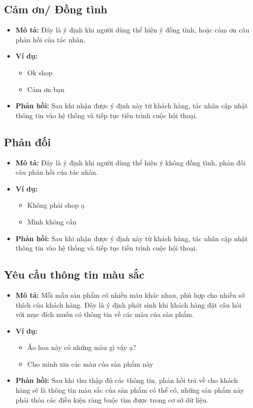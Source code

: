 \subsection{Cảm ơn/ Đồng tình}
\begin{itemize}
    \item \textbf{Mô tả:} Đây là ý định khi người dùng thể hiện ý đồng tình, hoặc cảm ơn câu phản hồi của tác nhân.
    \item \textbf{Ví dụ:}
    \begin{itemize}
        \item Ok shop
        \item Cảm ơn bạn
    \end{itemize}
    \item \textbf{Phản hồi:} Sau khi nhận được ý định này từ khách hàng, tác nhân cập nhật thông tin vào hệ thống và tiếp tục tiến trình cuộc hội thoại.
\end{itemize}

\subsection{Phản đối}
\begin{itemize}
    \item \textbf{Mô tả:} Đây là ý định khi người dùng thể hiện ý không đồng tình, phản đối câu phản hồi của tác nhân.
    \item \textbf{Ví dụ:}
    \begin{itemize}
        \item Không phải shop ạ
        \item Mình không cần
    \end{itemize}
    \item \textbf{Phản hồi:} Sau khi nhận được ý định này từ khách hàng, tác nhân cập nhật thông tin vào hệ thống và tiếp tục tiến trình cuộc hội thoại.
\end{itemize}

\subsection{Yêu cầu thông tin màu sắc}
\begin{itemize}
    \item \textbf{Mô tả:} Mỗi mẫu sản phẩm có nhiều màu khác nhau, phù hợp cho nhiều sở thích của khách hàng. Đây là ý định phát sinh khi khách hàng đặt câu hỏi với mục đích muốn có thông tin về các màu của sản phẩm.
    \item \textbf{Ví dụ:}
    \begin{itemize}
        \item Áo hoa này có những màu gì vậy ạ?
        \item Cho mình xin các màu của sản phẩm này
    \end{itemize}
    \item \textbf{Phản hồi:} Sau khi thu thập đủ các thông tin, phản hồi trả về cho khách hàng sẽ là thông tin màu sắc của sản phẩm có thể có, những sản phẩm này phải thỏa các điều kiện ràng buộc tìm được trong cơ sở dữ liệu.
\end{itemize}

